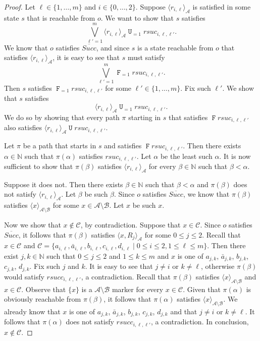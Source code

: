 \documentclass[a4paper,UKenglish,cleveref, autoref, thm-restate]{lipics-v2021}
\newcommand{\A}{\mathcal{A}}
\newcommand{\B}{\mathcal{B}}
\newcommand{\ex}[1]{\langle #1 \rangle}
\newcommand{\Succ}{\mathit{Succ}}
\newcommand{\rSuc}{\textit{rsuc}}
\newcommand*{\opu}{\operatorname{\pmb{\mathtt{U}}}}
\newcommand*{\opf}{\operatorname{\pmb{\mathtt{F}}}}
\newcommand*{\nat}{\mathbb{N}}
\begin{document}
\begin{proof}
Let $\ell \in \{1, \ldots, m\}$ and $i \in \{ 0, \ldots, 2 \}$.
Suppose $\ex{r_{i,\ell}}_{\A}$ is satisfied in some state $s$ that
is reachable from $o$.
We want to show that $s$ satisfies
\[
\bigvee_{\ell'=1}^m \ex{r_{i,\ell}}_{\A} \opu_{=1} \rSuc_{i,\ell,\ell'}.
\]
We know that $o$ satisfies $\overline{\Succ}$, and since $s$ is a state
reachable from $o$ that satisfies $\ex{r_{i,\ell}}_{\A}$,
it is easy to see that $s$ must satisfy
\[
\bigvee_{\ell'=1}^{m} \opf_{=1} rsuc_{i,\ell,\ell'}.
\]
Then $s$ satisfies $\opf_{=1} rsuc_{i,\ell,\ell'}$ for some
$\ell' \in \{ 1, \ldots, m \}$. Fix such $\ell'$.
We show that $s$ satisfies
\[
\ex{r_{i,\ell}}_{\A} \opu_{=1} \rSuc_{i,\ell,\ell'}.
\]
We do so by showing that every path $\pi$ starting in $s$
that satisfies $\opf rsuc_{i,\ell,\ell'}$ also satisfies
$\ex{r_{i,\ell}}_{\A} \opu \rSuc_{i,\ell,\ell'}$.


Let $\pi$ be a path that starts in $s$ and satisfies
$\opf rsuc_{i,\ell,\ell'}$.
Then there exists $\alpha \in \nat$ such that $\pi(\alpha)$ satisfies
$rsuc_{i,\ell,\ell'}$.
Let $\alpha$ be the least such $\alpha$.
It is now sufficient to show that $\pi(\beta)$ satisfies $\ex{r_{i,\ell}}_{\A}$ for every $\beta \in \nat$ such that $\beta < \alpha$.


Suppose it does not.
Then there exists $\beta \in \nat$ such that $\beta < \alpha$ and $\pi(\beta)$ does not satisfy $\ex{r_{i,\ell}}_{\A}$.
Let $\beta$ be such $\beta$.
Since $o$ satisfies \( \overline{\Succ} \),
we know that $\pi(\beta)$ satisfies \(\ex{x}_{\A \setminus \B}\) for some \(x \in \A \setminus \B\).
Let $x$ be such $x$.


Now we show that $x \not \in \mathcal{C}$, by contradiction.
Suppose that $x \in \mathcal{C}$.
Since $o$ satisfies \( \overline{\Succ} \),
it follows that $\pi(\beta)$ satisfies $\ex{x,R_j}_{\A}$ for some $0 \leq j \leq 2$.
Recall that $x \in \mathcal{C}$ and 
$\mathcal{C} = \{a_{i,\ell},\bar{a}_{i,\ell},b_{i,\ell},c_{i,\ell},d_{i,\ell} \mid 0\leq i \leq 2, 1\leq \ell \leq m\}$.
Then there exist $j,k \in \nat$ such that
$0 \leq j \leq 2$ and $1 \leq k \leq m$ and
$x$ is one of $a_{j,k}$, $\bar{a}_{j,k}$,
$b_{j,k}$, $c_{j,k}$, $d_{j,k}$.
Fix such $j$ and $k$.
It is easy to see that $j \neq i$ or $k \neq \ell$,
otherwise $\pi(\beta)$ would satisfy $rsucc_{i,\ell,\ell'}$, a contradiction.
Recall that $\pi(\beta)$ satisfies \( \ex{x}_{\A \setminus \B} \)
and $x \in \mathcal{C}$.
Observe that $\{x\}$ is a $\A \setminus \B$ marker for every $x \in \mathcal{C}$.
Given that $\pi(\alpha)$ is obviously reachable from $\pi(\beta)$,
it follows that $\pi(\alpha)$ satisfies \( \ex{x}_{\A \setminus \B} \).
We already know that $x$ is one of $a_{j,k}$, $\bar{a}_{j,k}$,
$b_{j,k}$, $c_{j,k}$, $d_{j,k}$ and that $j \neq i$ or $k \neq \ell$.
It follows that $\pi(\alpha)$ does not satisfy $rsucc_{i,\ell,\ell'}$,
a contradiction.
In conclusion, $x \not \in \mathcal{C}$.



\end{proof}
\end{document}
